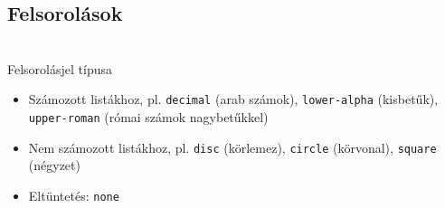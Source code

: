 \subsection{Felsorolások}

%
\begin{frame}
  \begin{description}[m]
    \item[\texttt{list-style-type}] \hfill \\ Felsorolásjel típusa\\
    \begin{itemize}
      \item Számozott listákhoz, pl. \texttt{decimal} (arab számok), \texttt{lower-alpha} (kisbetűk), \texttt{upper-roman} (római számok nagybetűkkel)
      \item Nem számozott listákhoz, pl. \texttt{disc} (körlemez), \texttt{circle} (körvonal), \texttt{square} (négyzet)
      \item Eltüntetés: \texttt{none}
    \end{itemize}
  \end{description}
\end{frame}

